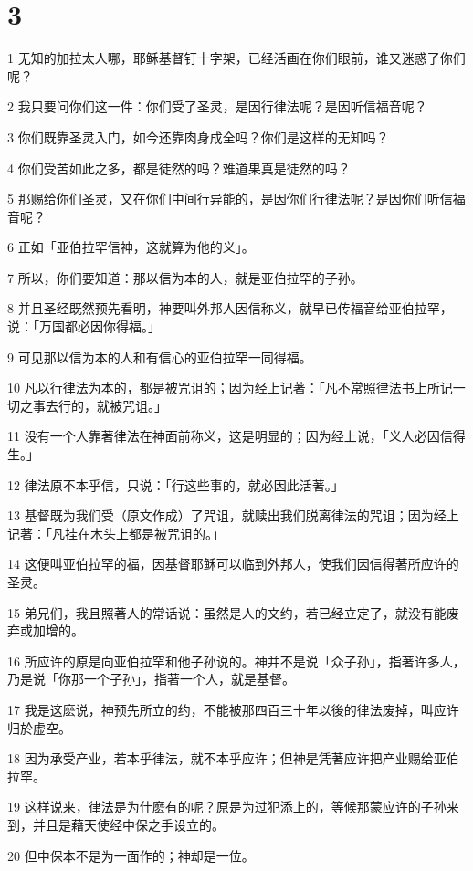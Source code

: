 \chapter{3}

\par 1 无知的加拉太人哪，耶稣基督钉十字架，已经活画在你们眼前，谁又迷惑了你们呢？
\par 2 我只要问你们这一件：你们受了圣灵，是因行律法呢？是因听信福音呢？
\par 3 你们既靠圣灵入门，如今还靠肉身成全吗？你们是这样的无知吗？
\par 4 你们受苦如此之多，都是徒然的吗？难道果真是徒然的吗？
\par 5 那赐给你们圣灵，又在你们中间行异能的，是因你们行律法呢？是因你们听信福音呢？
\par 6 正如「亚伯拉罕信神，这就算为他的义」。
\par 7 所以，你们要知道：那以信为本的人，就是亚伯拉罕的子孙。
\par 8 并且圣经既然预先看明，神要叫外邦人因信称义，就早已传福音给亚伯拉罕，说：「万国都必因你得福。」
\par 9 可见那以信为本的人和有信心的亚伯拉罕一同得福。
\par 10 凡以行律法为本的，都是被咒诅的；因为经上记著：「凡不常照律法书上所记一切之事去行的，就被咒诅。」
\par 11 没有一个人靠著律法在神面前称义，这是明显的；因为经上说，「义人必因信得生。」
\par 12 律法原不本乎信，只说：「行这些事的，就必因此活著。」
\par 13 基督既为我们受（原文作成）了咒诅，就赎出我们脱离律法的咒诅；因为经上记著：「凡挂在木头上都是被咒诅的。」
\par 14 这便叫亚伯拉罕的福，因基督耶稣可以临到外邦人，使我们因信得著所应许的圣灵。
\par 15 弟兄们，我且照著人的常话说：虽然是人的文约，若已经立定了，就没有能废弃或加增的。
\par 16 所应许的原是向亚伯拉罕和他子孙说的。神并不是说「众子孙」，指著许多人，乃是说「你那一个子孙」，指著一个人，就是基督。
\par 17 我是这麽说，神预先所立的约，不能被那四百三十年以後的律法废掉，叫应许归於虚空。
\par 18 因为承受产业，若本乎律法，就不本乎应许；但神是凭著应许把产业赐给亚伯拉罕。
\par 19 这样说来，律法是为什麽有的呢？原是为过犯添上的，等候那蒙应许的子孙来到，并且是藉天使经中保之手设立的。
\par 20 但中保本不是为一面作的；神却是一位。
